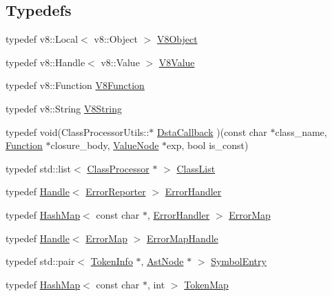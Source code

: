 \subsection*{Typedefs}
\begin{DoxyCompactItemize}
\item 
typedef v8::Local$<$ v8::Object $>$ \hyperlink{namespacemocha_ab7457ad2b98f5878f68f21f2c916ffb9}{V8Object}
\item 
typedef v8::Handle$<$ v8::Value $>$ \hyperlink{namespacemocha_a22eca0d76f439fca2a26cae77eb6ade4}{V8Value}
\item 
typedef v8::Function \hyperlink{namespacemocha_a6ba45e16246aba54ff2cd64ca991e089}{V8Function}
\item 
typedef v8::String \hyperlink{namespacemocha_a04d2fb2a4ea8d21353a943ebf4263970}{V8String}
\item 
typedef void(ClassProcessorUtils::$\ast$ \hyperlink{namespacemocha_ac3d8a2fe64806b144916b0b16719a540}{DstaCallback} )(const char $\ast$class\_\-name, \hyperlink{classmocha_1_1_function}{Function} $\ast$closure\_\-body, \hyperlink{classmocha_1_1_value_node}{ValueNode} $\ast$exp, bool is\_\-const)
\item 
typedef std::list$<$ \hyperlink{classmocha_1_1_class_processor}{ClassProcessor} $\ast$ $>$ \hyperlink{namespacemocha_a01ec919b1dd7cd6a9d355222341db47a}{ClassList}
\item 
typedef \hyperlink{classmocha_1_1_handle}{Handle}$<$ \hyperlink{classmocha_1_1_error_reporter}{ErrorReporter} $>$ \hyperlink{namespacemocha_a62a8540d653f9de4f6198d4a857c456f}{ErrorHandler}
\item 
typedef \hyperlink{classmocha_1_1_hash_map}{HashMap}$<$ const char $\ast$, \hyperlink{classmocha_1_1_handle}{ErrorHandler} $>$ \hyperlink{namespacemocha_a47a4cccd3c5221fb912446d3dc0e5234}{ErrorMap}
\item 
typedef \hyperlink{classmocha_1_1_handle}{Handle}$<$ \hyperlink{classmocha_1_1_hash_map}{ErrorMap} $>$ \hyperlink{namespacemocha_a8737c94f12ceeb67b4030427d00a1865}{ErrorMapHandle}
\item 
typedef std::pair$<$ \hyperlink{classmocha_1_1_token_info}{TokenInfo} $\ast$, \hyperlink{classmocha_1_1_ast_node}{AstNode} $\ast$ $>$ \hyperlink{namespacemocha_a692c3ca38973da32760e114599b8a960}{SymbolEntry}
\item 
typedef \hyperlink{classmocha_1_1_hash_map}{HashMap}$<$ const char $\ast$, int $>$ \hyperlink{namespacemocha_af3bb64b09dae0d96af52cb20d13d79a4}{TokenMap}
\item 

\end{DoxyCompactItemize}

